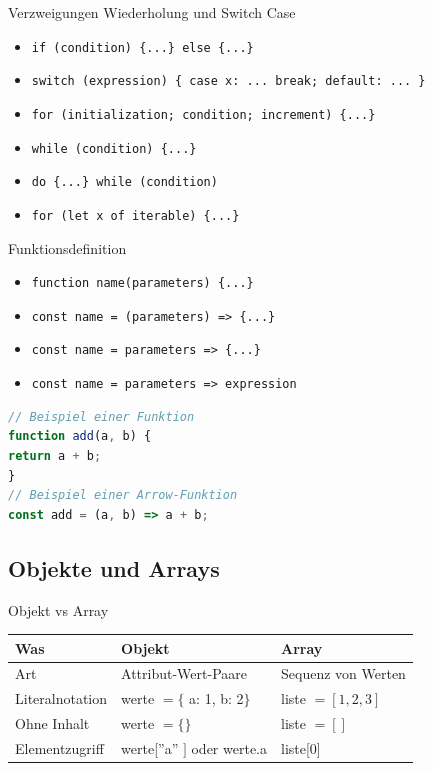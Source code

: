 \begin{KR}{Verzweigungen\text{,} Wiederholung und Switch Case}
    \begin{itemize}
        \item \texttt{if (condition) \{...\} else \{...\}}
        \item \texttt{switch (expression) \{ case x: ... break; default: ... \}}
        \item \texttt{for (initialization; condition; increment) \{...\}}
        \item \texttt{while (condition) \{...\}}
        \item \texttt{do \{...\} while (condition)}
        \item \texttt{for (let x of iterable) \{...\}}
    \end{itemize}
\end{KR}

\begin{KR}{Funktionsdefinition}
    \begin{itemize}
        \item \texttt{function name(parameters) \{...\}}
        \item \texttt{const name = (parameters) => \{...\}}
        \item \texttt{const name = parameters => \{...\}}
        \item \texttt{const name = parameters => expression}
    \end{itemize}
\begin{lstlisting}[language=JavaScript, style=base]
// Beispiel einer Funktion
function add(a, b) {
return a + b;
}
// Beispiel einer Arrow-Funktion
const add = (a, b) => a + b;
\end{lstlisting}
\end{KR}

\subsection{Objekte und Arrays}

\begin{concept}{Objekt vs Array}

    \begin{tabular}{|l|l|l|}
        \hline
        Was & Objekt & Array \\
        \hline
        Art & Attribut-Wert-Paare & Sequenz von Werten \\
        \hline
        Literalnotation & werte $=\{$ a: 1, b: 2$\}$ & liste $=[1,2,3]$ \\
        \hline
        Ohne Inhalt & werte $=\{ \}$ & liste $=[]$ \\
        \hline
        Elementzugriff & werte[''a'' $]$ oder werte.a & liste[0] \\
        \hline
        \end{tabular}
\end{concept}

